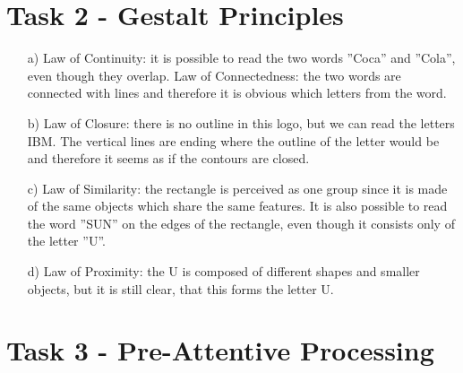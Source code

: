 \documentclass[a4paper]{article}
\begin{document}
\section*{Task 2 - Gestalt Principles}
\begin{enumerate}
	\item[a)]
	Law of Continuity: it is possible to read the two words ''Coca'' and ''Cola'', even though they overlap. 
	Law of Connectedness: the two words are connected with lines and therefore it is obvious which letters from the word. 
	\item[b)]
	Law of Closure: there is no outline in this logo, but we can read the letters IBM. The vertical lines are ending where the outline of the letter would be and therefore it seems as if the contours are closed.  
	\item[c)] 
	Law of Similarity: the rectangle is perceived as one group since it is made of the same objects which share the same features. 
	It is also possible to read the word ''SUN'' on the edges of the rectangle, even though it consists only of the letter ''U''.
	\item[d)] 
	Law of Proximity: the U is composed of different shapes and smaller objects, but it is still clear, that this forms the letter U. 
\end{enumerate}

\section*{Task 3 - Pre-Attentive Processing}
	
\end{document}
